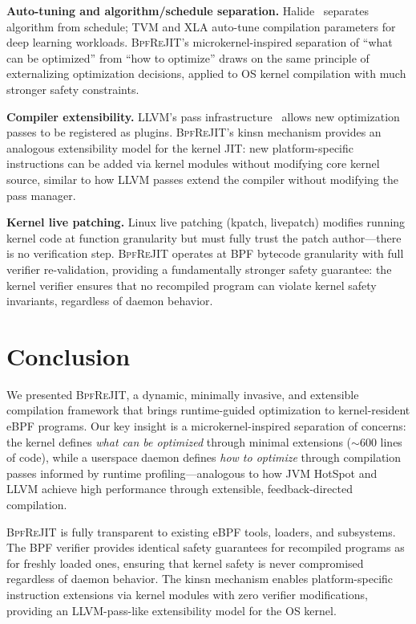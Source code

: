 \documentclass[sigconf,anonymous]{acmart}
\begin{document}
\textbf{Auto-tuning and algorithm/schedule separation.}
Halide~\cite{halide} separates algorithm from schedule; TVM and XLA
auto-tune compilation parameters for deep learning workloads.
\textsc{BpfReJIT}'s microkernel-inspired separation of ``what can be
optimized'' from ``how to optimize'' draws on the same principle of
externalizing optimization decisions, applied to OS kernel compilation
with much stronger safety constraints.

\textbf{Compiler extensibility.}
LLVM's pass infrastructure~\cite{llvm} allows new optimization passes
to be registered as plugins. \textsc{BpfReJIT}'s kinsn mechanism
provides an analogous extensibility model for the kernel JIT: new
platform-specific instructions can be added via kernel modules without
modifying core kernel source, similar to how LLVM passes extend the
compiler without modifying the pass manager.

\textbf{Kernel live patching.}
Linux live patching (kpatch, livepatch) modifies running kernel code
at function granularity but must fully trust the patch author---there
is no verification step. \textsc{BpfReJIT} operates at BPF bytecode
granularity with full verifier re-validation, providing a fundamentally
stronger safety guarantee: the kernel verifier ensures that no
recompiled program can violate kernel safety invariants, regardless of
daemon behavior.

\section{Conclusion}
\label{sec:conclusion}

We presented \textsc{BpfReJIT}, a dynamic, minimally invasive, and
extensible compilation framework that brings runtime-guided optimization
to kernel-resident eBPF programs. Our key insight is a
microkernel-inspired separation of concerns: the kernel defines
\emph{what can be optimized} through minimal extensions (${\sim}$600
lines of code), while a userspace daemon defines \emph{how to optimize}
through compilation passes informed by runtime profiling---analogous to
how JVM HotSpot and LLVM achieve high performance through extensible,
feedback-directed compilation.

\textsc{BpfReJIT} is fully transparent to existing eBPF tools, loaders,
and subsystems. The BPF verifier provides identical safety guarantees
for recompiled programs as for freshly loaded ones, ensuring that
kernel safety is never compromised regardless of daemon behavior. The
kinsn mechanism enables platform-specific instruction extensions via
kernel modules with zero verifier modifications, providing an
LLVM-pass-like extensibility model for the OS kernel.
\end{document}
